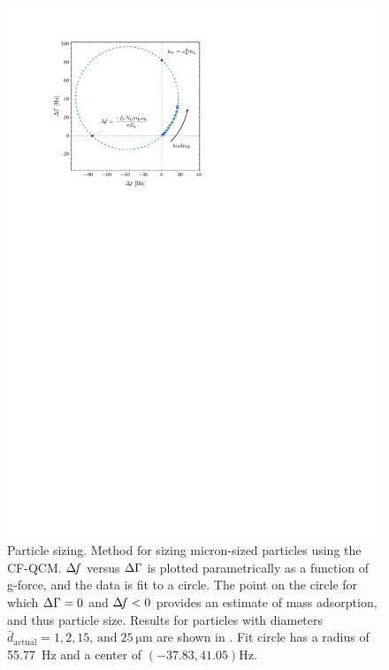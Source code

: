 \begin{figure}[ht]
\centering
\includegraphics{qcm/figures/figure4.pdf}
\caption{ Particle sizing.  Method for sizing micron-sized particles using the CF-QCM. 
$\Delta\!f$ versus $\Delta\Gamma$ is plotted parametrically as a function of g-force, and
the data is fit to a circle.  The point on the circle for which $\Delta\Gamma=0$ and
$\Delta\!f<0$ provides an estimate of mass adsorption, and thus particle size.
Results for particles with diameters $\bar{d}_\mathrm{actual}=1, 2,
15,\,\mathrm{and}\;\SI{25}{\micro\meter}$ are shown in
.  Fit circle has a radius of \SI{55.77}{\hertz} and
a center of $(-37.83,41.05) \si{\hertz}$. }
\label{fig:circlefit}
\end{figure}

